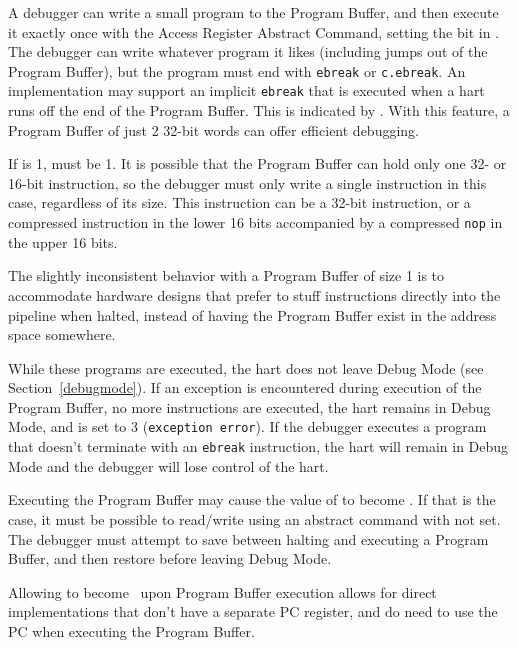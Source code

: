 A debugger can write a small program to the Program Buffer, and then
execute it exactly once with the Access Register Abstract Command,
setting the \FacAccessregisterPostexec bit in \RdmCommand.
The debugger can write whatever program it likes (including jumps out of the
Program Buffer), but the program must end with
{\tt ebreak} or {\tt c.ebreak}. An implementation may support
an implicit {\tt ebreak} that is executed when a hart runs off the end of the
Program Buffer. This is indicated by \FdmDmstatusImpebreak. With this feature, a Program
Buffer of just 2 32-bit words can offer efficient debugging.

If \FdmAbstractcsProgbufsize is 1, \FdmDmstatusImpebreak must be 1. It is possible that the Program
Buffer can hold only one 32- or 16-bit instruction, so the debugger must only
write a single instruction in this case, regardless of its size.
This instruction can be a 32-bit
instruction, or a compressed instruction in the lower 16 bits accompanied by a
compressed {\tt nop} in the upper 16 bits.

\begin{commentary}
    The slightly inconsistent behavior with a Program Buffer of size 1 is to
    accommodate hardware designs that prefer to stuff instructions directly
    into the pipeline when halted, instead of having the Program Buffer exist
    in the address space somewhere.
\end{commentary}

While these programs are executed, the hart does not leave Debug Mode (see
Section~\ref{debugmode}).  If an exception is encountered during execution of
the Program Buffer, no more instructions are executed, the hart remains in Debug
Mode, and \FdmAbstractcsCmderr is set to 3 ({\tt exception error}).  If the debugger
executes a program that doesn't terminate with an {\tt ebreak} instruction, the
hart will remain in Debug Mode and the debugger will lose control of the hart.

Executing the Program Buffer may cause the value of \RcsrDpc to become \unspecified. If that is the case, it must be
possible to read/write \RcsrDpc using an abstract command with \FacAccessregisterPostexec not set.
The debugger must attempt to save \RcsrDpc between halting and
executing a Program Buffer, and then restore \RcsrDpc before leaving Debug Mode.

\begin{commentary}
    Allowing \RcsrDpc to become \unspecified\ upon Program Buffer execution
    allows for direct
    implementations that don't have a separate PC register, and do need to use
    the PC when executing the Program Buffer.
\end{commentary}

